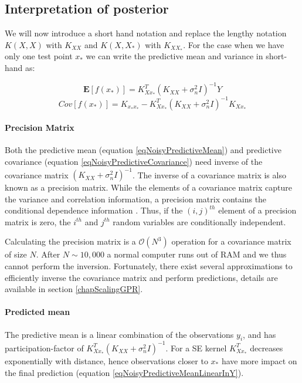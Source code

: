 \subsection{Interpretation of posterior}
We will now introduce a short hand notation and replace the lengthy notation $K(X, X)$ with $K_{XX}$ and $K(X, X_{*})$ with $K_{XX_{*}}$. For the case when we have only one test point $x_{*}$ we can write the predictive mean and variance in short-hand as:

  \begin{equation}\label{eqNoisyPredictiveMean}
  \mathbf{E}[f(x_{*})] = K_{Xx_{*}}^{T}( K_{XX} + \sigma^{2}_{n}I)^{-1}Y
  \end{equation}
  \begin{equation}\label{eqNoisyPredictiveCovariance}
	Cov[f(x_{*})] = K_{x_{*}x_{*}} - K_{Xx_{*}}^{T}( K_{XX} + \sigma^{2}_{n}I )^{-1} K_{Xx_{*}}
  \end{equation}

\paragraph{Precision Matrix}  
Both the predictive mean (equation \ref{eqNoisyPredictiveMean}) and predictive covariance (equation \ref{eqNoisyPredictiveCovariance}) need inverse of the covariance matrix $( K_{XX} + \sigma^{2}_{n}I)^{-1}$. The inverse of a covariance matrix is also known as a precision matrix. While the elements of a covariance matrix capture the variance and correlation information, a precision matrix contains the conditional dependence information \cite{mackay2003information}. Thus, if the $(i, j)^{th}$ element of a precision matrix is zero, the $i^{th}$ and $j^{th}$ random variables are conditionally independent. 

Calculating the precision matrix is a $\mathcal{O}\left ( N^{3} \right )$ operation for a covariance matrix of size $N$. After $N \sim 10,000$ a normal computer runs out of RAM and we thus cannot perform the inversion. Fortunately, there exist several approximations to efficiently inverse the covariance matrix and perform predictions, details are available in section \ref{chapScalingGPR}.

\paragraph{Predicted mean}
The predictive mean is a linear combination of the observations $y_{i}$, and has participation-factor of $K_{Xx_{*}}^{T}( K_{XX} + \sigma^{2}_{n}I)^{-1}$. For a SE kernel $K_{Xx_{*}}^{T}$ decreases exponentially with distance, hence observations closer to $x_{*}$ have more impact on the final prediction (equation \ref{eqNoisyPredictiveMeanLinearInY}). 
  
